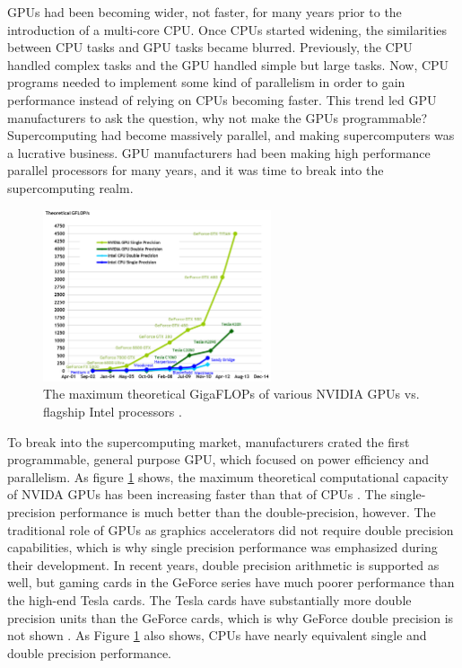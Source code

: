 GPUs had been becoming wider, not faster, for many years prior to the introduction of a multi-core CPU.   %
Once CPUs started widening, the similarities between CPU tasks and GPU tasks became blurred.  Previously, the CPU handled complex tasks and the GPU handled simple but large tasks.  Now, CPU programs needed to implement some kind of parallelism in order to gain performance instead of relying on CPUs becoming faster.  %
This trend led GPU manufacturers to ask the question, why not make the GPUs programmable?  Supercomputing had become massively parallel, and making supercomputers was a lucrative business.  GPU manufacturers had been making high performance parallel processors for many years, and it was time to break into the supercomputing realm.

\begin{figure}[h!] 
  \centering
    \includegraphics[width=0.6\textwidth]{graphics/computational_cap.pdf}
     \caption[The maximum theoretical GigaFLOPs of various NVIDIA GPUs vs. flagship Intel processors.]{The maximum theoretical GigaFLOPs of various NVIDIA GPUs vs. flagship Intel processors \cite{cuda}. \label{computational_cap}}
\end{figure}

To break into the supercomputing market, manufacturers crated the first programmable, general purpose GPU, which focused on power efficiency and parallelism.  As figure \ref{computational_cap} shows, the maximum theoretical computational capacity of NVIDA GPUs has been increasing faster than that of CPUs \cite{cuda}.  The single-precision performance is much better than the double-precision, however.  The traditional role of GPUs as graphics accelerators did not require double precision capabilities, which is why single precision performance was emphasized during their development.  In recent years, double precision arithmetic is supported as well,
but gaming cards in the GeForce series have much poorer performance than the high-end Tesla cards.  The Tesla cards have substantially more double precision units than the GeForce cards, which is why GeForce double precision is not shown \cite{fermi}.  As Figure \ref{computational_cap} also shows, CPUs have nearly equivalent single and double precision performance. 

